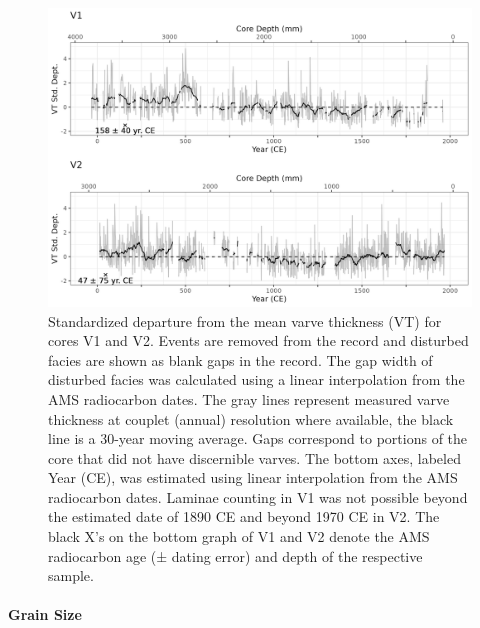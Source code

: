\documentclass[Royal,times,doublespace,sageh]{sagej}
\begin{document}
\begin{figure}

{\centering \includegraphics[width=1\linewidth]{figs/V1_V2_varvethickness_vs_depth_and_C14_est_yr_ma} 

}

\caption{Standardized departure from the mean varve thickness (VT) for cores V1 and V2. Events are removed from the record and disturbed facies are shown as blank gaps in the record. The gap width of disturbed facies was calculated using a linear interpolation from the AMS radiocarbon dates. The gray lines represent measured varve thickness at couplet (annual) resolution where available, the black line is a 30-year moving average. Gaps correspond to portions of the core that did not have discernible varves. The bottom axes, labeled Year (CE), was estimated using linear interpolation from the AMS radiocarbon dates. Laminae counting in V1 was not possible beyond the estimated date of 1890 CE and beyond 1970 CE in V2. The black X's on the bottom graph of V1 and V2 denote the AMS radiocarbon age (± dating error) and depth of the respective sample.\label{varves-a}}\label{fig:varves-a}
\end{figure}

\hypertarget{grain-size}{%
\paragraph{Grain Size}\label{grain-size}}
\end{document}
